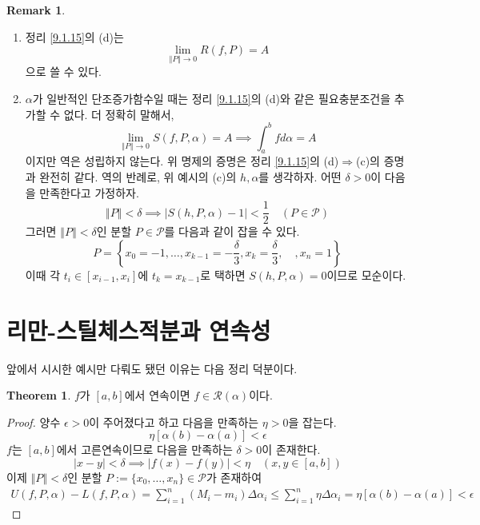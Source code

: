 \documentclass[11pt]{book}
\numberwithin{equation}{chapter}
\def\eps{\epsilon}
\def\calP{\mathcal{P}}
\def\calR{\mathcal{R}}
\newcommand{\abs}[1]{\left\vert#1\right\vert}
\newcommand{\norm}[1]{\left\Vert#1\right\Vert}
\theoremstyle{definition}
\newtheorem{thm}{Theorem}[section]
\newtheorem*{rem}{Remark}
\newenvironment{enum}
	{\begin{enumerate}[label=(\alph*), leftmargin=2\parindent]}
	{\end{enumerate}}
\begin{document}
\begin{rem}
    \quad

    \begin{enum}
        \item 정리 \ref{9.1.15}의 (d)는
        \[
            \lim_{\norm{P} \to 0} R(f, P) = A
        \]
        으로 쓸 수 있다.
        \item \(\alpha\)가 일반적인 단조증가함수일 때는 정리 \ref{9.1.15}의 (d)와 같은 필요충분조건을 추가할 수 없다. 더 정확히 말해서,
        \[
            \lim_{\norm{P} \to 0} S(f, P, \alpha) = A \implies \int_a^b f d\alpha = A
        \]
        이지만 역은 성립하지 않는다. 위 명제의 증명은 정리 \ref{9.1.15}의 (d)\(\Rightarrow\)(c)의 증명과 완전히 같다. 역의 반례로, 위 예시의 (c)의 \(h, \alpha\)를 생각하자. 어떤 \(\delta > 0\)이 다음을 만족한다고 가정하자.
        \[
            \norm{P} < \delta \implies \abs{S(h, P, \alpha) - 1} < \frac{1}{2} \quad (P \in \calP)
        \]
        그러면 \(\norm{P} < \delta\)인 분할 \(P \in \calP\)를 다음과 같이 잡을 수 있다.
        \[
            P = \left\{x_0=-1, \ldots, x_{k-1} = -\frac{\delta}{3}, x_k = \frac{\delta}{3}, \quad, x_n=1 \right\}
        \]
        이때 각 \(t_i \in [x_{i-1}, x_i]\)에 \(t_k = x_{k-1}\)로 택하면 \(S(h, P, \alpha) = 0\)이므로 모순이다.
    \end{enum}
    
\end{rem}

\section{리만-스틸체스적분과 연속성}

앞에서 시시한 예시만 다뤄도 됐던 이유는 다음 정리 덕분이다.

\begin{thm}
    \(f\)가 \([a, b]\)에서 연속이면 \(f \in \calR(\alpha)\)이다.
\end{thm}
\begin{proof}
    양수 \(\eps > 0\)이 주어졌다고 하고 다음을 만족하는 \(\eta > 0\)을 잡는다.
    \[
        \eta[\alpha(b) - \alpha(a)] < \eps
    \]
    \(f\)는 \([a, b]\)에서 고른연속이므로 다음을 만족하는 \(\delta > 0\)이 존재한다.
    \[
        \abs{x - y} < \delta \implies \abs{f(x) - f(y)} < \eta \quad (x, y \in [a, b])
    \]
    이제 \(\norm{P} < \delta\)인 분할 \(P := \{x_0, \ldots, x_n\} \in \calP\)가 존재하여
    \begin{align*}
        U(f, P, \alpha) - L(f, P, \alpha) = \sum_{i=1}^n (M_i - m_i) \Delta \alpha_i \le \sum_{i=1}^n \eta \Delta \alpha_i = \eta[\alpha(b) - \alpha(a)] < \eps
    \end{align*}
\end{proof}
\end{document}
